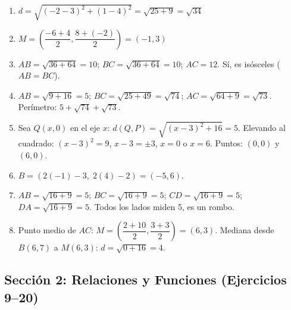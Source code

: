 \documentclass[12pt, letterpaper]{article}
\begin{document}
  \begin{enumerate}[series=respuestas, leftmargin=*, label=\textbf{\arabic*.}]
    \item $d = \sqrt{(-2-3)^2 + (1-4)^2} = \sqrt{25 + 9} = \sqrt{34}$

    \item $M = \left(\dfrac{-6+4}{2}, \dfrac{8+(-2)}{2}\right) = (-1, 3)$

    \item $AB = \sqrt{36 + 64} = 10$; $BC = \sqrt{36 + 64} = 10$; $AC = 12$. Sí, es isósceles ($AB = BC$).

    \item $AB = \sqrt{9 + 16} = 5$; $BC = \sqrt{25 + 49} = \sqrt{74}$; $AC = \sqrt{64 + 9} = \sqrt{73}$. Perímetro: $5 + \sqrt{74} + \sqrt{73}$.

    \item Sea $Q(x, 0)$ en el eje $x$: $d(Q, P) = \sqrt{(x - 3)^2 + 16} = 5$. Elevando al cuadrado: $(x-3)^2 = 9$, $x - 3 = \pm 3$, $x = 0$ o $x = 6$. Puntos: $(0, 0)$ y $(6, 0)$.

    \item $B = (2(-1) - 3, \; 2(4) - 2) = (-5, 6)$.

    \item $AB = \sqrt{16 + 9} = 5$; $BC = \sqrt{16 + 9} = 5$; $CD = \sqrt{16 + 9} = 5$; $DA = \sqrt{16 + 9} = 5$. Todos los lados miden 5, es un rombo.

    \item Punto medio de $AC$: $M = \left(\dfrac{2 + 10}{2}, \dfrac{3 + 3}{2}\right) = (6, 3)$. Mediana desde $B(6, 7)$ a $M(6, 3)$: $d = \sqrt{0 + 16} = 4$.
  \end{enumerate}

  \newpage


  \subsection*{Sección 2: Relaciones y Funciones (Ejercicios 9--20)}
\end{document}
